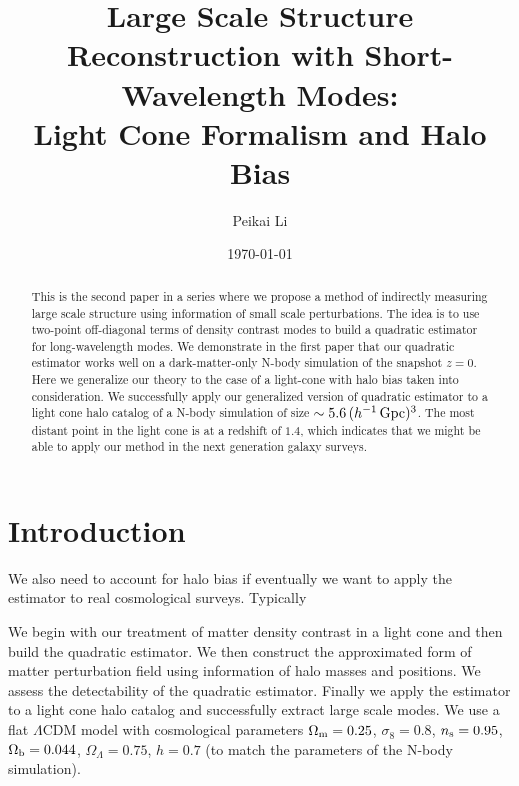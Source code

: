 \documentclass[prd,amsmath,amssymb,floatfix,superscriptaddress,nofootinbib,twocolumn]{revtex4-1}
\begin{document}
\title{Large Scale Structure Reconstruction with Short-Wavelength Modes: \\Light Cone Formalism and Halo Bias}
\author{\large Peikai Li}

\date{\today}
\begin{abstract}
\noindent This is the second paper in a series where we propose a method of indirectly measuring large scale structure using information of small scale perturbations. The idea is to use two-point off-diagonal terms of density contrast modes to build a quadratic estimator for long-wavelength modes. We demonstrate in the first paper that our quadratic estimator works well on a dark-matter-only N-body simulation of the snapshot $z=0$. Here we generalize our theory to the case of a light-cone with halo bias taken into consideration. We successfully apply our generalized version of quadratic estimator to a light cone halo catalog of a N-body simulation of size $\sim5.6\,(h^{-1}\,\rm Gpc)^3$. The most distant point in the light cone is at a redshift of $1.4$, which indicates that we might be able to apply our method in the next generation galaxy surveys.
\end{abstract}
\maketitle
\section{Introduction}
We also need to account for halo bias \cite{Kravtsov:1999hb}\cite{Desjacques:2018rev} if eventually we want to apply the estimator to real cosmological surveys. Typically 

We begin with our treatment of matter density contrast in a light cone and then build the quadratic estimator. We then construct the approximated form of matter perturbation field using information of halo masses and positions. We assess the detectability of the quadratic estimator. Finally we apply the estimator to a light cone halo catalog and successfully extract large scale modes. We use a flat $\Lambda$CDM model with cosmological parameters $\Omega_{\rm m}=0.25$, $\sigma_{8}=0.8$, $n_{\rm s}=0.95$, $\Omega_{\rm b}=0.044$, $\Omega_{\Lambda}=0.75$, $h=0.7$ (to match the parameters of the N-body simulation).
\end{document}
